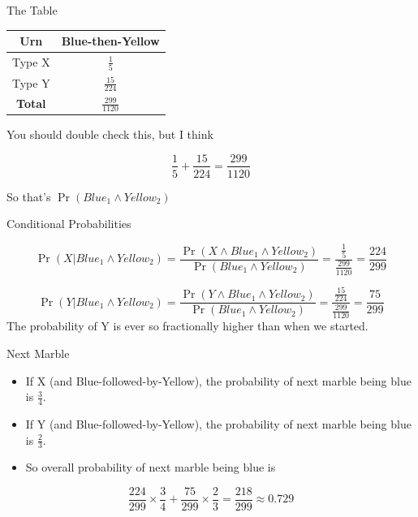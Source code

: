 \documentclass[
  ignorenonframetext,
]{beamer}
\providecommand{\tightlist}{%
  \setlength{\itemsep}{0pt}\setlength{\parskip}{0pt}}
\renewcommand{\,}{\text{, }}
\begin{document}
\begin{frame}{The Table}
\protect\hypertarget{the-table-8}{}

\begin{longtable}[]{@{}cc@{}}
\toprule
Urn & Blue-then-Yellow\tabularnewline
\midrule
\endhead
Type X & \(\frac{1}{5}\)\tabularnewline
Type Y & \(\frac{15}{224}\)\tabularnewline
\textbf{Total} & \(\frac{299}{1120}\)\tabularnewline
\bottomrule
\end{longtable}

You should double check this, but I think

\[
\frac{1}{5} + \frac{15}{224} = \frac{299}{1120}
\]

So that's \(\Pr(Blue_1 \wedge Yellow_2)\)

\end{frame}

\begin{frame}{Conditional Probabilities}
\protect\hypertarget{conditional-probabilities}{}

\[
\Pr(X | Blue_1 \wedge Yellow_2) = \frac{\Pr(X \wedge Blue_1 \wedge Yellow_2)}{\Pr(Blue_1 \wedge Yellow_2)} = \frac{\frac{1}{5}}{\frac{299}{1120}} = \frac{224}{299}
\]

\[
\Pr(Y | Blue_1 \wedge Yellow_2) = \frac{\Pr(Y \wedge Blue_1 \wedge Yellow_2)}{\Pr(Blue_1 \wedge Yellow_2)} = \frac{\frac{15}{224}}{\frac{299}{1120}} = \frac{75}{299}
\] The probability of Y is ever so fractionally higher than when we
started.

\end{frame}

\begin{frame}{Next Marble}
\protect\hypertarget{next-marble}{}

\begin{itemize}
\tightlist
\item
  If X (and Blue-followed-by-Yellow), the probability of next marble
  being blue is \(\frac{3}{4}\).
\item
  If Y (and Blue-followed-by-Yellow), the probability of next marble
  being blue is \(\frac{2}{3}\). \pause
\item
  So overall probability of next marble being blue is
\end{itemize}

\[
 \frac{224}{299} \times \frac{3}{4} + \frac{75}{299} \times \frac{2}{3} = \frac{218}{299} \approx 0.729
\]

\end{frame}
\end{document}
